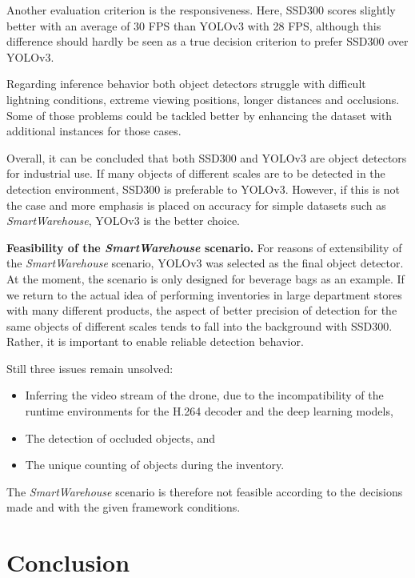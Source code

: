 \documentclass[a4paper, 10pt, journal]{wissarbIEEE}      %
\begin{document}
Another evaluation criterion is the responsiveness. Here, SSD300 scores slightly better with an average of 30 FPS than YOLOv3 with 28 FPS, although this difference should hardly be seen as a true decision criterion to prefer SSD300 over YOLOv3.

Regarding inference behavior both object detectors struggle with difficult lightning conditions, extreme viewing positions, longer distances and occlusions. Some of those problems could be tackled better by enhancing the dataset with additional instances for those cases.
 
Overall, it can be concluded that both SSD300 and YOLOv3 are object detectors for industrial use. If many objects of different scales are to be detected in the detection environment, SSD300 is preferable to YOLOv3. However, if this is not the case and more emphasis is placed on accuracy for simple datasets such as \textit{SmartWarehouse}, YOLOv3 is the better choice.

\textbf{Feasibility of the \textit{SmartWarehouse} scenario.} For reasons of extensibility of the \textit{SmartWarehouse} scenario, YOLOv3 was selected as the final object detector. At the moment, the scenario is only designed for beverage bags as an example. If we return to the actual idea of performing inventories in large department stores with many different products, the aspect of better precision of detection for the same objects of different scales tends to fall into the background with SSD300. Rather, it is important to enable reliable detection behavior.

Still three issues remain unsolved:

\begin{itemize}
	\item Inferring the video stream of the drone, due to the incompatibility of the runtime environments for the H.264 decoder and the deep learning models,
	\item The detection of occluded objects, and
	\item The unique counting of objects during the inventory.
\end{itemize}

The \textit{SmartWarehouse} scenario is therefore not feasible according to the decisions made and with the given framework conditions.

\section{Conclusion} \label{conclusion}
\end{document}
